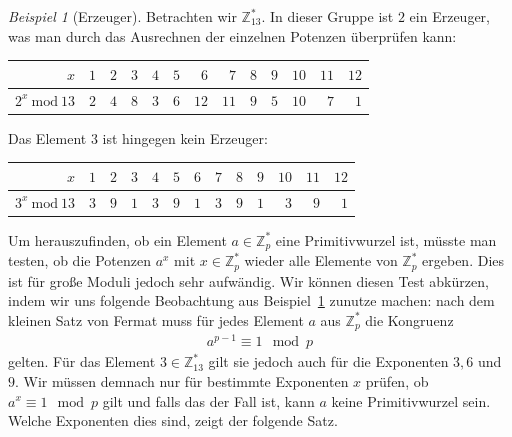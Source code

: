 \documentclass[
  a4paper,
  11pt,
]{scrartcl}
\theoremstyle{plain}
\theoremstyle{definition}
\theoremstyle{remark}
\newtheorem{beispiel}{Beispiel}
\newcommand{\Z}{\mathbb{Z}}
\newcommand{\Mod}[1]{\ \mathrm{mod}\ #1}
\begin{document}
\begin{beispiel}[Erzeuger]\label{bsp:erzeuger}
  Betrachten wir $\Z_{13}^*$. In dieser Gruppe ist $2$ ein Erzeuger, was man
  durch das Ausrechnen der einzelnen Potenzen überprüfen kann:
  \begin{center}
    \begin{tabular}{r*{12}{r}}
      \toprule
      $x$ & $1$ & $2$ & $3$ & $4$ & $5$ & $6$ & $7$ & $8$ & $9$ & $10$ & $11$ & $12$\\
      \midrule
      $2^x \Mod{13}$ & $2$ & $4$ & $8$ & $3$ & $6$ & $12$ & $11$ & $9$ & $5$ & $10$ & $7$ & $1$\\
      \bottomrule
    \end{tabular}
  \end{center}
  Das Element $3$ ist hingegen kein Erzeuger:
  \begin{center}
    \begin{tabular}{r*{12}{r}}
      \toprule
      $x$ & $1$ & $2$ & $3$ & $4$ & $5$ & $6$ & $7$ & $8$ & $9$ & $10$ & $11$ & $12$\\
      \midrule
      $3^x \Mod{13}$ & $3$ & $9$ & $1$ & $3$ & $9$ & $1$ & $3$ & $9$ & $1$ & $3$ & $9$ & $1$\\
      \bottomrule
    \end{tabular}
  \end{center}
\end{beispiel}

Um herauszufinden, ob ein Element $a \in \Z_p^*$ eine Primitivwurzel ist, müsste
man testen, ob die Potenzen $a^x$ mit $x \in \Z_p^*$ wieder alle Elemente von
$\Z_p^*$ ergeben. Dies ist für große Moduli jedoch sehr aufwändig. Wir können
diesen Test abkürzen, indem wir uns folgende Beobachtung aus
Beispiel~\ref{bsp:erzeuger} zunutze machen: nach dem kleinen Satz von Fermat
muss für jedes Element $a$ aus $\Z_p^*$ die Kongruenz
\begin{align*}
  a^{p-1} \equiv 1 \mod p
\end{align*}
gelten. Für das Element $3 \in \Z_{13}^*$ gilt sie jedoch auch für die
Exponenten $3, 6$ und $9$. Wir müssen demnach nur für bestimmte Exponenten $x$
prüfen, ob $a^x \equiv 1 \mod p$ gilt und falls das der Fall ist, kann $a$ keine
Primitivwurzel sein. Welche Exponenten dies sind, zeigt der folgende Satz.
\end{document}
